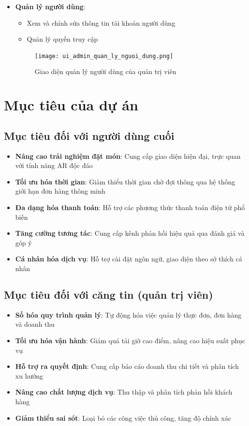 \documentclass[12pt,a4paper]{article}
\begin{document}
\begin{itemize}[leftmargin=1cm]
    \item \textbf{Quản lý người dùng}:
        \begin{itemize}[leftmargin=0.5cm]
            \item Xem và chỉnh sửa thông tin tài khoản người dùng
            \item Quản lý quyền truy cập
        \end{itemize}
\begin{figure}[H]
    \centering
    \texttt{[image: ui\_admin\_quan\_ly\_nguoi\_dung.png]} %
    \caption{Giao diện quản lý người dùng của quản trị viên}
    \label{fig:ui_admin_users}
\end{figure}
\end{itemize}

\section{Mục tiêu của dự án}

\subsection{Mục tiêu đối với người dùng cuối}
\begin{itemize}[leftmargin=1cm]
    \item \textbf{Nâng cao trải nghiệm đặt món}: Cung cấp giao diện hiện đại, trực quan với tính năng AR độc đáo
    \item \textbf{Tối ưu hóa thời gian}: Giảm thiểu thời gian chờ đợi thông qua hệ thống giới hạn đơn hàng thông minh
    \item \textbf{Đa dạng hóa thanh toán}: Hỗ trợ các phương thức thanh toán điện tử phổ biến
    \item \textbf{Tăng cường tương tác}: Cung cấp kênh phản hồi hiệu quả qua đánh giá và góp ý
    \item \textbf{Cá nhân hóa dịch vụ}: Hỗ trợ cài đặt ngôn ngữ, giao diện theo sở thích cá nhân
\end{itemize}

\subsection{Mục tiêu đối với căng tin (quản trị viên)}
\begin{itemize}[leftmargin=1cm]
    \item \textbf{Số hóa quy trình quản lý}: Tự động hóa việc quản lý thực đơn, đơn hàng và doanh thu
    \item \textbf{Tối ưu hóa vận hành}: Giảm quá tải giờ cao điểm, nâng cao hiệu suất phục vụ
    \item \textbf{Hỗ trợ ra quyết định}: Cung cấp báo cáo doanh thu chi tiết và phân tích xu hướng
    \item \textbf{Nâng cao chất lượng dịch vụ}: Thu thập và phân tích phản hồi khách hàng
    \item \textbf{Giảm thiểu sai sót}: Loại bỏ các công việc thủ công, tăng độ chính xác
\end{itemize}
\end{document}
